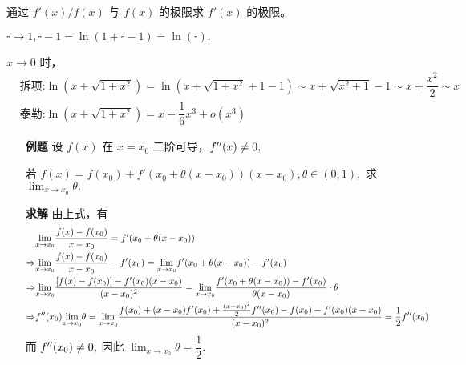 通过 $ f'(x)/f(x) $ 与 $ f(x) $ 的极限求 $ f'(x) $ 的极限。


$ \square \rightarrow 1, \square - 1 = \ln (1 + \square - 1) = \ln(\square). $ 


$ x \rightarrow 0 $ 时，
\begin{equation*}
    \begin{aligned}
        &\textrm{拆项:} \ln(x+\sqrt{1+x^2}) = \ln(x+\sqrt{1+x^2}+1-1) 
        \sim x + \sqrt{x^2+1} - 1 \sim x + \dfrac{x^2}{2} \sim x\\ 
        &\textrm{泰勒:} \ln(x+\sqrt{1+x^2}) = x - \dfrac{1}{6}x^3 + o(x^3)
    \end{aligned}
\end{equation*}


\begin{enumerate}
    \item[\textbf{例题}] 设 $ f(x) $ 在 $ x = x_0 $ 二阶可导，$ f^{\prime\prime}(x) \neq 0, $ 
    
    若 $ f(x) = f(x_0) + f'(x_0+\theta(x-x_0))(x-x_0),\theta\in (0,1), $ 
    求 $ {\displaystyle\lim_{x\rightarrow x_0}}\theta. $ 
    \item[\textbf{求解}] 由上式，有
    \begin{equation*}
        \begin{aligned}
            &{\displaystyle\lim_{x\rightarrow x_0}}\dfrac{f(x) - f(x_0)}{x-x_0} = f'(x_0+\theta(x-x_0))\\ 
            \Rightarrow & {\displaystyle\lim_{x\rightarrow x_0}}
            \dfrac{f(x) - f(x_0)}{x-x_0} - f'(x_0) = {\displaystyle\lim_{x\rightarrow x_0}}
            f'(x_0+\theta(x-x_0)) - f'(x_0)\\ 
            \Rightarrow & {\displaystyle\lim_{x\rightarrow x_0}}
            \dfrac{[f(x) - f(x_0)] - f'(x_0)(x-x_0)}{(x-x_0)^2} 
            = {\displaystyle\lim_{x\rightarrow x_0}}
            \dfrac{f'(x_0+\theta(x-x_0)) - f'(x_0)}{\theta(x-x_0)}\cdot\theta \\ 
            \Rightarrow & f^{\prime\prime}(x_0){\displaystyle\lim_{x\rightarrow x_0}}\theta
            = {\displaystyle\lim_{x\rightarrow x_0}}
            \dfrac{f(x_0) + (x-x_0)f'(x_0) + \frac{(x-x_0)^2}{2}f^{\prime\prime}(x_0) - f(x_0) - f'(x_0)(x-x_0)
            }{(x-x_0)^2} = \dfrac{1}{2}f^{\prime\prime}(x_0)
        \end{aligned}
    \end{equation*}
    而 $ f^{\prime\prime} (x_0)\neq 0, $ 因此 $ {\displaystyle\lim_{x\rightarrow x_0}}\theta = \dfrac12. $ 
\end{enumerate}

